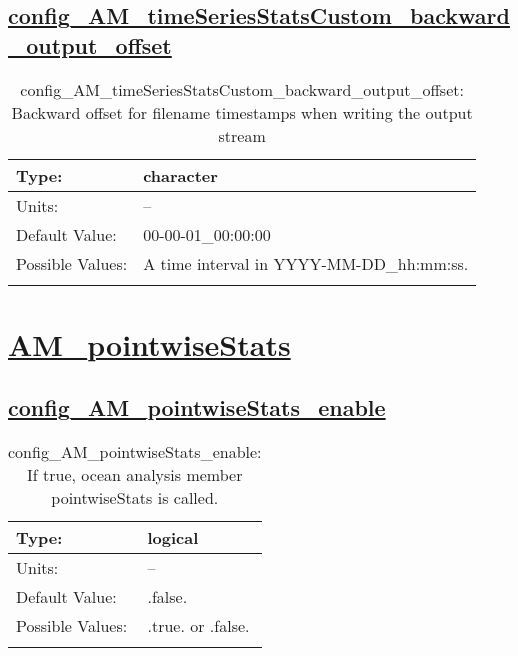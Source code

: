 \subsection[config\_AM\_timeSeriesStatsCustom\_backward\_output\_offset]{\hyperref[sec:nm_tab_AM_timeSeriesStatsCustom]{config\_AM\_timeSeriesStatsCustom\_backward\_output\_offset}}
\label{subsec:nm_sec_config_AM_timeSeriesStatsCustom_backward_output_offset}
\begin{center}
\begin{longtable}{| p{2.0in} || p{4.0in} |}
    \hline
    Type: & character \\
    \hline
    Units: & -- \\
    \hline
    Default Value: & 00-00-01\_00:00:00 \\
    \hline
    Possible Values: & A time interval in YYYY-MM-DD\_hh:mm:ss. \\
    \hline
    \caption{config\_AM\_timeSeriesStatsCustom\_backward\_output\_offset: Backward offset for filename timestamps when writing the output stream}
\end{longtable}
\end{center}
\section[AM\_pointwiseStats]{\hyperref[sec:nm_tab_AM_pointwiseStats]{AM\_pointwiseStats}}
\label{sec:nm_sec_AM_pointwiseStats}
\subsection[config\_AM\_pointwiseStats\_enable]{\hyperref[sec:nm_tab_AM_pointwiseStats]{config\_AM\_pointwiseStats\_enable}}
\label{subsec:nm_sec_config_AM_pointwiseStats_enable}
\begin{center}
\begin{longtable}{| p{2.0in} || p{4.0in} |}
    \hline
    Type: & logical \\
    \hline
    Units: & -- \\
    \hline
    Default Value: & .false. \\
    \hline
    Possible Values: & .true. or .false. \\
    \hline
    \caption{config\_AM\_pointwiseStats\_enable: If true, ocean analysis member pointwiseStats is called.}
\end{longtable}
\end{center}
